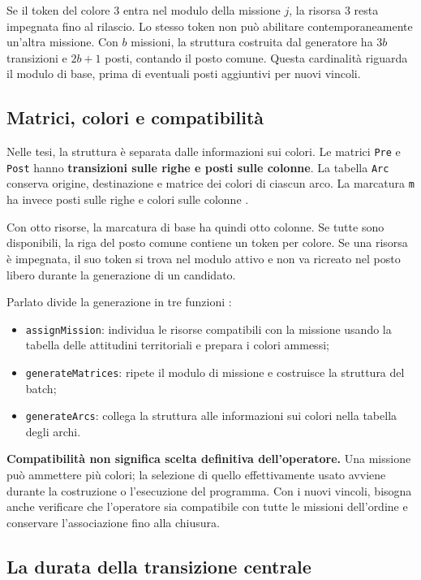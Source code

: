\documentclass[a4paper,11pt]{article}
\begin{document}
Se il token del colore 3 entra nel modulo della missione $j$, la risorsa 3 resta impegnata fino al rilascio. Lo stesso token non può abilitare contemporaneamente un'altra missione. Con $b$ missioni, la struttura costruita dal generatore ha $3b$ transizioni e $2b+1$ posti, contando il posto comune. Questa cardinalità riguarda il modulo di base, prima di eventuali posti aggiuntivi per nuovi vincoli.

\subsection{Matrici, colori e compatibilità}

Nelle tesi, la struttura è separata dalle informazioni sui colori. Le matrici \texttt{Pre} e \texttt{Post} hanno \textbf{transizioni sulle righe e posti sulle colonne}. La tabella \texttt{Arc} conserva origine, destinazione e matrice dei colori di ciascun arco. La marcatura \texttt{m} ha invece posti sulle righe e colori sulle colonne \cite[sezione 2.6.1, pp. 14--15]{Rotondo}.

Con otto risorse, la marcatura di base ha quindi otto colonne. Se tutte sono disponibili, la riga del posto comune contiene un token per colore. Se una risorsa è impegnata, il suo token si trova nel modulo attivo e non va ricreato nel posto libero durante la generazione di un candidato.

Parlato divide la generazione in tre funzioni \cite[sezione 2.3.2, pp. 17--23]{Parlato}:
\begin{itemize}
    \item \texttt{assignMission}: individua le risorse compatibili con la missione usando la tabella delle attitudini territoriali e prepara i colori ammessi;
    \item \texttt{generateMatrices}: ripete il modulo di missione e costruisce la struttura del batch;
    \item \texttt{generateArcs}: collega la struttura alle informazioni sui colori nella tabella degli archi.
\end{itemize}

\textbf{Compatibilità non significa scelta definitiva dell'operatore.} Una missione può ammettere più colori; la selezione di quello effettivamente usato avviene durante la costruzione o l'esecuzione del programma. Con i nuovi vincoli, bisogna anche verificare che l'operatore sia compatibile con tutte le missioni dell'ordine e conservare l'associazione fino alla chiusura.

\subsection{La durata della transizione centrale}
\end{document}
